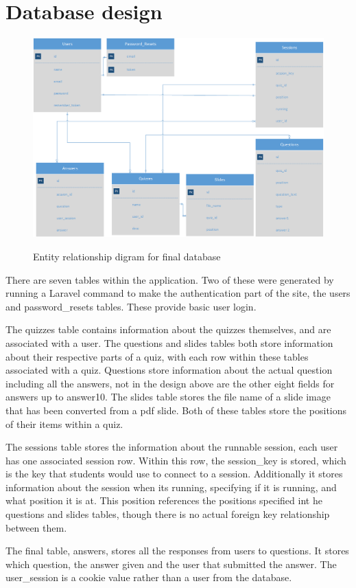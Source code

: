 \section{Database design}
\begin{figure}
	\caption{Entity relationship digram for final database}
	\includegraphics[width=\textwidth]{Chapter3/Final-ER-Image}
	\label{fig:er-diagram}
\end{figure}
\newpage

There are seven tables within the application. Two of these were generated by running a Laravel command to make the authentication part of the site, the users and password\_resets tables. These provide basic user login.

The quizzes table contains information about the quizzes themselves, and are associated with a user. The questions and slides tables both store information about their respective parts of a quiz, with each row within these tables associated with a quiz. Questions store information about the actual question including all the answers, not in the design above are the other eight fields for answers up to answer10. The slides table stores the file name of a slide image that has been converted from a pdf slide. Both of these tables store the positions of their items within a quiz.

The sessions table stores the information about the runnable session, each user has one associated session row. Within this row, the session\_key is stored, which is the key that students would use to connect to a session. Additionally it stores information about the session when its running, specifying if it is running, and what position it is at. This position references the positions specified int he questions and slides tables, though there is no actual foreign key relationship between them. 

The final table, answers, stores all the responses from users to questions. It stores which question, the answer given and the user that submitted the answer. The user\_session is a cookie value rather than a user from the database.

